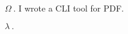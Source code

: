 \documentclass{article}
\begin{document}
\ttfamily
\sloppy
\vspace*{\fill}
\begin{itemize}
	\item[\textcolor{PINKD}{$\Omega ~.$}]\textcolor{PINKD}{I wrote a CLI tool for PDF.}

	\item[\textcolor{WHITE01}{$\lambda ~.$}]
\inputminted[tabsize=4, breaklines, mathescape]{bash}{main.sh}
\end{itemize}
\vspace*{\fill}

\pagebreak
\pgfmathparse{2pt+3.4pt}
\end{document}

